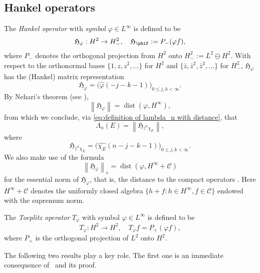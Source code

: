 \documentclass[11pt,reqno]{amsart}
\numberwithin{equation}{section}
\theoremstyle{plain}
\theoremstyle{definition}
\begin{document}
\subsection{Hankel operators}	
	The \emph{Hankel operator} with \emph{symbol} ${\varphi} \in L^{\infty}$ is defined to be 
	$${\mathfrak{H}}_{\varphi}:H^2 \to H^2_-, \quad {\mathfrak{H}}_\phif := P_-( {\varphi} f),$$ where 
	$P_-$ denotes the orthogonal projection from $H^2$ onto $H^2_-:=L^2 \ominus H^2$.
	With respect to the orthonormal bases $\{1,z,z^2,\ldots\}$ for $H^2$ and $\{\bar z ,\bar z^2,\bar z^3,\ldots\}$
	for $H^2_-$,  ${\mathfrak{H}}_{\varphi}$ has the (Hankel) matrix representation
	\begin{equation*}
		{\mathfrak{H}}_{\varphi} = \big( \widehat{\varphi}(-j-k-1) \big)_{0 \leq j, k < \infty}.
	\end{equation*}
	By Nehari's theorem (see \cite{Nehari} \cite[Theorem 1.1.1]{Peller}),
	\begin{equation} \label{norm-Hankel-dist}
	{\left\| {{\mathfrak{H}}_{\varphi}} \right\|} = {\operatorname{dist}}({\varphi},H^{\infty}),
	\end{equation}
	from which we conclude, via \eqref{eq:definition of lambda_n with distance}, that
	\begin{equation}\label{eq:definition of lambda_n with hankel}
		\Lambda_n(E)= {\left\| { {\mathfrak{H}}_{\bar z^n \chi_E} } \right\|},
	\end{equation}
	where
	\begin{equation*}
		{\mathfrak{H}}_{\bar z^n \chi_E}=\big(\widehat{\chi_E}(n-j-k-1)\big)_{0 \leq j, k < \infty}.
	\end{equation*}
	We  also make use of the formula 
	\begin{equation}\label{eq:EssentialDistance}
		{\left\| { {\mathfrak{H}}_{\varphi}} \right\|}_e = {\operatorname{dist}}({\varphi},H^{\infty}+ \mathcal{C})
	\end{equation}
	for the essential norm of ${\mathfrak{H}}_{\varphi}$, that is, the distance to the compact operators \cite[1.5.3]{Peller}.  Here $H^{\infty}+\mathcal{C}$ denotes the uniformly closed
	algebra $\{ h + f : h \in H^{\infty}, f \in \mathcal{C}\}$ endowed with the supremum norm.  	

The  \emph{Toeplitz operator}  $T_{\varphi}$ with symbol ${\varphi} \in L^{\infty}$ is defined to be
$$T_{\varphi}: H^2 \to H^2, \quad T_{\varphi} f = P_{+}(\varphi f),$$
where $P_{+}$ is the orthogonal projection of $L^2$ onto $H^2$. 	
	
	The following two results play a key role. The first one is an immediate consequence of~\cite[Thm.~7.5.5]{Peller} and its proof.
 
\end{document}
